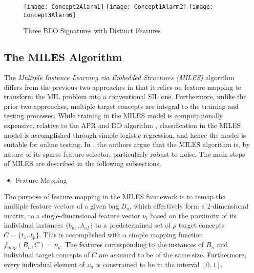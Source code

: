 \documentclass[12pt,dvips]{report}
\numberwithin{equation}{section}
\begin{document}
\begin{figure}[htb]
  \centerline{\texttt{[image: Concept2Alarm1]} \texttt{[image: Concept1Alarm2]} \texttt{[image: Concept3Alarm6]}}
\caption{Three BEO Signatures with Distinct Features}
\label{fig:SigsofTargetConcepts}
\end{figure}




\subsection{The MILES Algorithm} \label{subsec:MILES_description}

The \emph{Multiple Instance Learning via Embedded Structures (MILES)} \emph{} algorithm \cite{chen06_miles} differs from the previous two approaches in that it relies on feature mapping to transform the MIL problem into a conventional SIL one. Furthermore, unlike the prior two approaches, multiple target concepts are integral to the training and testing processes. While training in the MILES model is computationally expensive, relative to the APR and DD algorithm \cite{amor13}, classification in the MILES model is accomplished through simple logistic regression, and hence the model is suitable for online testing. In \cite{chen06_miles}, the authors argue that the MILES algorithm is, by nature of its sparse feature selector, particularly robust to noise. The main steps of  MILES are described in the following subsections.

\begin{itemize}[leftmargin=12 pt]
\item Feature Mapping
\end{itemize}

The purpose of feature mapping in the MILES framework is to remap the multiple feature vectors of a given bag $B_{n}$, which effectively form a 2-dimensional matrix, to a single-dimensional feature vector $\nu_{i}$ based on the proximity of its individual instances $\{b_{n1}..b_{nI}\}$ to a predetermined set of $p$ target concepts $C=\{t_{1}..t_{p}\}$. This is accomplished with a simple mapping function $f_{map}(B_{n},C)=\nu_{n}$. The features corresponding to the instances of $B_{n}$ and individual target concepts of $C$ are assumed to be of the same size. Furthermore, every individual element of $\nu_{n}$ is constrained to be in the interval $[0,1]$. 
\end{document}
